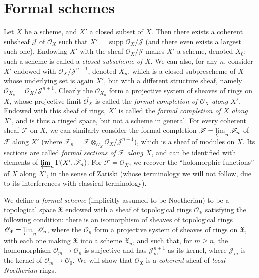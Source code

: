 \documentclass{article}
\newcommand{\scr}[1]{{\mathscr{#1}}}
\newcommand{\fk}{\mathfrak}
\renewcommand{\geq}{\geqslant}
\DeclareMathOperator{\supp}{supp}
\newcommand{\oldpage}[1]{\marginpar{\footnotesize$\Big\vert$ \textit{p.~#1}}}
\begin{document}
\section{Formal schemes}
\label{section2}

Let $X$ be a scheme, and $X'$ a closed subset of $X$.
Then there exists a coherent subsheaf $\scr{J}$ of $\scr{O}_X$ such that $X'=\supp\scr{O}_X/\scr{J}$ (and there even exists a largest such one).
Endowing $X'$ with the sheaf $\scr{O}_X/\scr{J}$ makes $X'$ a scheme, denoted $X_0$;
such a scheme is called a \emph{closed subscheme of $X$}.
We can also, for any $n$, consider $X'$ endowed with $\scr{O}_X/\scr{J}^{n+1}$, denoted $X_n$, which is a closed subprescheme of $X$ whose underlying set is again $X'$, but with a different structure sheaf, namely $\scr{O}_{X_n}=\scr{O}_X/\scr{J}^{n+1}$.
Clearly the $\scr{O}_{X_n}$ form a projective system of sheaves of rings on $X$, whose projective limit $\overline{\scr{O}_X}$ is called the \emph{formal completion of $\scr{O}_X$ along $X'$}.
Endowed with this sheaf of rings, $X'$ is called the \emph{formal completion of $X$ along $X'$}, and is thus a ringed space, but not a scheme in general.
For every coherent sheaf $\scr{F}$ on $X$, we can similarly consider the formal completion $\overline{\scr{F}}=\varprojlim_n\scr{F}_n$ of $\scr{F}$ along $X'$ (where $\scr{F}_n=\scr{F}\otimes_{\scr{O}_X}\scr{O}_X/\scr{J}^{n+1}$), which is a sheaf of modules on $\overline{X}$.
Its sections are called \emph{formal sections of $\scr{F}$ along $X$}, and can be identified with elements of $\varprojlim_n\Gamma(X',\scr{F}_n)$.
For $\scr{F}=\scr{O}_X$, we recover the ``holomorphic functions'' of $X$ along $X'$, in the sense of Zariski (whose terminology we will not follow, due to its interferences with classical terminology).

We define a \emph{formal scheme} (implicitly assumed to be Noetherian) to be a topological space $\fk{X}$ endowed with a sheaf of topological rings $\scr{O}_{\fk{X}}$ satisfying the following condition:
there is an isomorphism of sheaves of topological rings $\scr{O}_{\fk{X}}=\varprojlim_n\scr{O}_n$, where the $\scr{O}_n$ form a projective system of sheaves of rings on $\fk{X}$, with each one making $\fk{X}$ into a scheme $\fk{X}_n$, and such that, for $m\geq n$, the homomorphism $\scr{O}_m\to\scr{O}_n$ is surjective and has $\scr{J}_m^{n+1}$ as its kernel, where $\scr{J}_m$ is
\oldpage{182-04}
the kernel of $\scr{O}_m\to\scr{O}_0$.
We will show that $\scr{O}_{\fk{X}}$ is a \emph{coherent} sheaf of \emph{local Noetherian} rings.
\end{document}
